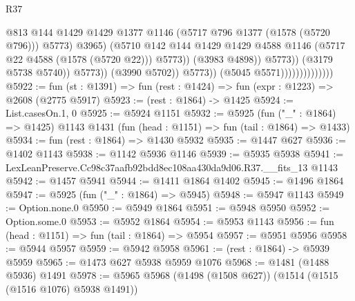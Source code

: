 \begin{lexlean}{R37}
\begin{coremodule}
                                                      @813
                                                      @144
                                                      @1429
                                                      @1429
                                                      @1377
                                                      @1146
                                                      (@5717 @796 @1377 (@1578 (@5720 @796)))
                                                      @5773)
                                                    @3965)
                                                  (@5710
                                                    @142
                                                    @144
                                                    @1429
                                                    @1429
                                                    @4588
                                                    @1146
                                                    (@5717 @22 @4588 (@1578 (@5720 @22)))
                                                    @5773))
                                                (@3983 @4898))
                                              @5773))
                                          (@3179 @5738 @5740))
                                        @5773))
                                    (@3990 @5702))
                                  @5773))
                              (@5045 @5571))))))))))))))
@5922 := fun (st : @1391) => fun (rest : @1424) => fun (expr : @1223) => @2608 (@2775 @5917)
@5923 := (rest : @1864) -> @1425
@5924 := List.casesOn.{1, 0}
@5925 := @5924 @1151
@5932 := @5925
    (fun ("_" : @1864) => @1425)
    @1143
    @1431
    (fun (head : @1151) => fun (tail : @1864) => @1433)
@5934 := fun (rest : @1864) => @1430 @5932
@5935 := @1447 @627
@5936 := @1402 @1143
@5938 := @1142 @5936 @1146
@5939 := @5935 @5938
@5941 := LexLeanPreserve.Cc98c37aafb92bdd8ec108aa430da9d06.R37.__fits_13 @1143
@5942 := @1457 @5941
@5944 := @1411 @1864 @1402
@5945 := @1496 @1864
@5947 := @5925 (fun ("_" : @1864) => @5945)
@5948 := @5947 @1143
@5949 := Option.none.{0}
@5950 := @5949 @1864
@5951 := @5948 @5950
@5952 := Option.some.{0}
@5953 := @5952 @1864
@5954 := @5953 @1143
@5956 := fun (head : @1151) => fun (tail : @1864) => @5954
@5957 := @5951 @5956
@5958 := @5944 @5957
@5959 := @5942 @5958
@5961 := (rest : @1864) -> @5939 @5959
@5965 := @1473 @627 @5938 @5959 @1076
@5968 := @1481 (@1488 @5936) @1491
@5978 := @5965 @5968 (@1498 (@1508 @627)) (@1514 (@1515 (@1516 @1076) @5938 @1491))

\end{coremodule}
\end{lexlean}
